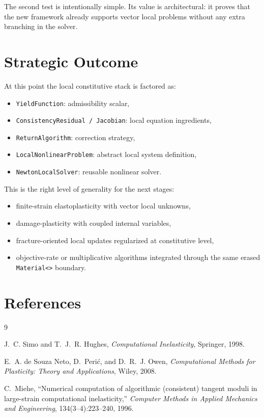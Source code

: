The second test is intentionally simple.  Its value is architectural: it proves
that the new framework already supports vector local problems without any extra
branching in the solver.

\section{Strategic Outcome}

At this point the local constitutive stack is factored as:
\begin{itemize}
  \item \texttt{YieldFunction}: admissibility scalar,
  \item \texttt{ConsistencyResidual / Jacobian}: local equation ingredients,
  \item \texttt{ReturnAlgorithm}: correction strategy,
  \item \texttt{LocalNonlinearProblem}: abstract local system definition,
  \item \texttt{NewtonLocalSolver}: reusable nonlinear solver.
\end{itemize}

This is the right level of generality for the next stages:
\begin{itemize}
  \item finite-strain elastoplasticity with vector local unknowns,
  \item damage-plasticity with coupled internal variables,
  \item fracture-oriented local updates regularized at constitutive level,
  \item objective-rate or multiplicative algorithms integrated through the same
        erased \texttt{Material<>} boundary.
\end{itemize}

\section{References}

\begin{thebibliography}{9}

J.~C. Simo and T.~J.~R. Hughes,
\emph{Computational Inelasticity},
Springer, 1998.

E.~A. de Souza Neto, D.~Peri\'{c}, and D.~R.~J. Owen,
\emph{Computational Methods for Plasticity: Theory and Applications},
Wiley, 2008.

C.~Miehe,
``Numerical computation of algorithmic (consistent) tangent moduli in large-strain computational inelasticity,''
\emph{Computer Methods in Applied Mechanics and Engineering},
134(3--4):223--240, 1996.

\end{thebibliography}
